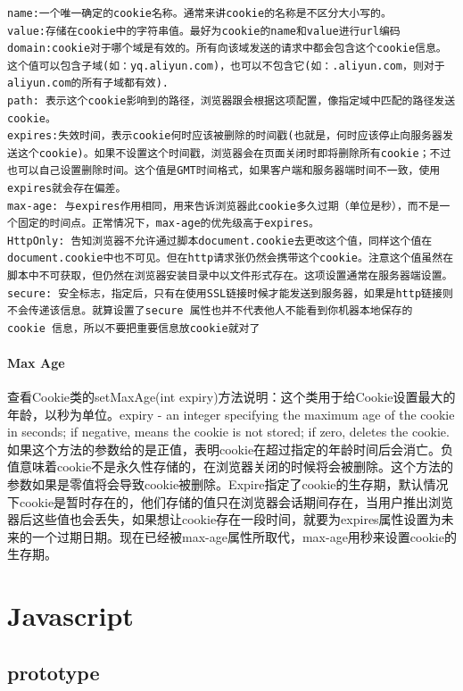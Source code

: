 \documentclass[letter]{book}
\begin{document}
\begin{lstlisting}
name:一个唯一确定的cookie名称。通常来讲cookie的名称是不区分大小写的。
value:存储在cookie中的字符串值。最好为cookie的name和value进行url编码
domain:cookie对于哪个域是有效的。所有向该域发送的请求中都会包含这个cookie信息。这个值可以包含子域(如：yq.aliyun.com)，也可以不包含它(如：.aliyun.com，则对于aliyun.com的所有子域都有效).
path: 表示这个cookie影响到的路径，浏览器跟会根据这项配置，像指定域中匹配的路径发送cookie。
expires:失效时间，表示cookie何时应该被删除的时间戳(也就是，何时应该停止向服务器发送这个cookie)。如果不设置这个时间戳，浏览器会在页面关闭时即将删除所有cookie；不过也可以自己设置删除时间。这个值是GMT时间格式，如果客户端和服务器端时间不一致，使用expires就会存在偏差。
max-age: 与expires作用相同，用来告诉浏览器此cookie多久过期（单位是秒），而不是一个固定的时间点。正常情况下，max-age的优先级高于expires。
HttpOnly: 告知浏览器不允许通过脚本document.cookie去更改这个值，同样这个值在document.cookie中也不可见。但在http请求张仍然会携带这个cookie。注意这个值虽然在脚本中不可获取，但仍然在浏览器安装目录中以文件形式存在。这项设置通常在服务器端设置。
secure: 安全标志，指定后，只有在使用SSL链接时候才能发送到服务器，如果是http链接则不会传递该信息。就算设置了secure 属性也并不代表他人不能看到你机器本地保存的 cookie 信息，所以不要把重要信息放cookie就对了
\end{lstlisting}

\paragraph{Max Age}查看Cookie类的setMaxAge(int expiry)方法说明：这个类用于给Cookie设置最大的年龄，以秒为单位。expiry - an integer specifying the maximum age of the cookie in seconds; if negative, means the cookie is not stored; if zero, deletes the cookie.如果这个方法的参数给的是正值，表明cookie在超过指定的年龄时间后会消亡。负值意味着cookie不是永久性存储的，在浏览器关闭的时候将会被删除。这个方法的参数如果是零值将会导致cookie被删除。Expire指定了cookie的生存期，默认情况下cookie是暂时存在的，他们存储的值只在浏览器会话期间存在，当用户推出浏览器后这些值也会丢失，如果想让cookie存在一段时间，就要为expires属性设置为未来的一个过期日期。现在已经被max-age属性所取代，max-age用秒来设置cookie的生存期。

\section{Javascript}

\subsection{prototype}
\end{document}
